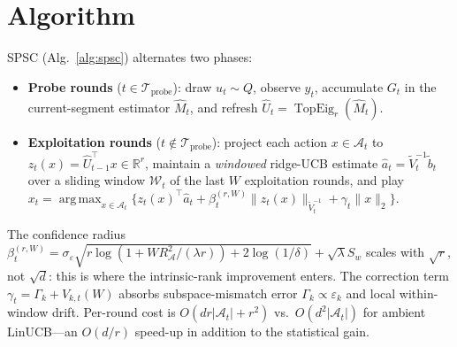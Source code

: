 \documentclass{article}
\newcommand{\R}{\mathbb{R}}
\newcommand{\cA}{\mathcal{A}}
\newcommand{\cW}{\mathcal{W}}
\newcommand{\cTprobe}{\mathcal{T}_{\mathrm{probe}}}
\DeclareMathOperator{\TopEig}{TopEig}
\DeclareMathOperator*{\argmax}{arg\,max}
\begin{document}
\section{Algorithm}
\label{sec:algorithm}

SPSC (Alg.~\ref{alg:spsc}) alternates two phases:
\begin{itemize}[leftmargin=1.5em,nosep]
\item \textbf{Probe rounds} ($t\in\cTprobe$): draw $u_t\sim Q$, observe
$y_t$, accumulate $G_t$ in the current-segment estimator $\widehat M_t$,
and refresh $\widehat U_t = \TopEig_r(\widehat M_t)$.
\item \textbf{Exploitation rounds} ($t\notin\cTprobe$): project each
action $x\in\cA_t$ to $z_t(x) = \widehat U_{t-1}^\top x\in\R^r$, maintain a
\emph{windowed} ridge-UCB estimate
$\widehat a_t = \widetilde V_t^{-1}\widetilde b_t$ over a sliding
window $\cW_t$ of the last $W$ exploitation rounds, and play
$x_t = \argmax_{x\in\cA_t}
\bigl\{ z_t(x)^\top\widehat a_t + \beta_t^{(r,W)}\|z_t(x)\|_{\widetilde V_t^{-1}}
+ \gamma_t \|x\|_2 \bigr\}$.
\end{itemize}
The confidence radius
$\beta_t^{(r,W)}=\sigma_\varepsilon\sqrt{r\log(1+WR_\cA^2/(\lambda r))
+2\log(1/\delta)}+\sqrt{\lambda}S_w$
scales with $\sqrt{r}$, not $\sqrt{d}$: this is where the intrinsic-rank
improvement enters. The correction term
$\gamma_t = \Gamma_k + V_{k,t}(W)$
absorbs subspace-mismatch error $\Gamma_k\propto\varepsilon_k$ and
local within-window drift. Per-round cost is $O(dr|\cA_t|+r^2)$ vs.\
$O(d^2|\cA_t|)$ for ambient LinUCB---an $O(d/r)$ speed-up in addition
to the statistical gain.
\end{document}
